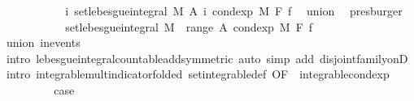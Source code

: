 \begin{isabellebody}
\ \ \ \ \ \ \isamarkupfalse%
\ \isamarkupfalse%
\ {\isachardoublequoteopen}{\isachardot}{\kern0pt}{\isachardot}{\kern0pt}{\isachardot}{\kern0pt}\ {\isacharequal}{\kern0pt}\ {\isacharparenleft}{\kern0pt}{\isasymSum}i{\isachardot}{\kern0pt}\ set{\isacharunderscore}{\kern0pt}lebesgue{\isacharunderscore}{\kern0pt}integral\ M\ {\isacharparenleft}{\kern0pt}A\ i{\isacharparenright}{\kern0pt}\ {\isacharparenleft}{\kern0pt}cond{\isacharunderscore}{\kern0pt}exp\ M\ F\ f{\isacharparenright}{\kern0pt}{\isacharparenright}{\kern0pt}{\isachardoublequoteclose}\ \isamarkupfalse%
\ union\ \isamarkupfalse%
\ presburger\isanewline
\ \ \ \ \ \ \isamarkupfalse%
\ \isamarkupfalse%
\ {\isachardoublequoteopen}{\isachardot}{\kern0pt}{\isachardot}{\kern0pt}{\isachardot}{\kern0pt}\ {\isacharequal}{\kern0pt}\ set{\isacharunderscore}{\kern0pt}lebesgue{\isacharunderscore}{\kern0pt}integral\ M\ {\isacharparenleft}{\kern0pt}{\isasymUnion}\ {\isacharparenleft}{\kern0pt}range\ A{\isacharparenright}{\kern0pt}{\isacharparenright}{\kern0pt}\ {\isacharparenleft}{\kern0pt}cond{\isacharunderscore}{\kern0pt}exp\ M\ F\ f{\isacharparenright}{\kern0pt}{\isachardoublequoteclose}\isanewline
\ \ \ \ \ \ \ \ \isamarkupfalse%
\ union\ in{\isacharunderscore}{\kern0pt}events\isanewline
\ \ \ \ \ \ \ \ \isamarkupfalse%
\ {\isacharparenleft}{\kern0pt}intro\ lebesgue{\isacharunderscore}{\kern0pt}integral{\isacharunderscore}{\kern0pt}countable{\isacharunderscore}{\kern0pt}add{\isacharbrackleft}{\kern0pt}symmetric{\isacharbrackright}{\kern0pt}{\isacharparenright}{\kern0pt}\ {\isacharparenleft}{\kern0pt}auto\ simp\ add{\isacharcolon}{\kern0pt}\ disjoint{\isacharunderscore}{\kern0pt}family{\isacharunderscore}{\kern0pt}onD\ intro{\isacharbang}{\kern0pt}{\isacharcolon}{\kern0pt}\ integrable{\isacharunderscore}{\kern0pt}mult{\isacharunderscore}{\kern0pt}indicator{\isacharbrackleft}{\kern0pt}folded\ set{\isacharunderscore}{\kern0pt}integrable{\isacharunderscore}{\kern0pt}def{\isacharcomma}{\kern0pt}\ OF\ {\isacharunderscore}{\kern0pt}\ integrable{\isacharunderscore}{\kern0pt}cond{\isacharunderscore}{\kern0pt}exp{\isacharbrackright}{\kern0pt}{\isacharparenright}{\kern0pt}\ \isanewline
\ \ \ \ \ \ \isamarkupfalse%
\ \isamarkupfalse%
\ {\isacharquery}{\kern0pt}case\ \isacommand{{\isachardot}{\kern0pt}}\isamarkupfalse%
\isanewline
\ \ \ \ \isamarkupfalse%
\isanewline
\ \ \isacommand{{\isacharbraceright}{\kern0pt}}\isamarkupfalse%
\isanewline

\end{isabellebody}
